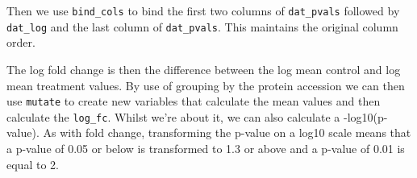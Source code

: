 \documentclass[12pt,]{book}
\newenvironment{Shaded}{\begin{snugshade}}{\end{snugshade}}
\newcommand{\KeywordTok}[1]{\textcolor[rgb]{0.13,0.29,0.53}{\textbf{#1}}}
\newcommand{\DataTypeTok}[1]{\textcolor[rgb]{0.13,0.29,0.53}{#1}}
\newcommand{\DecValTok}[1]{\textcolor[rgb]{0.00,0.00,0.81}{#1}}
\newcommand{\StringTok}[1]{\textcolor[rgb]{0.31,0.60,0.02}{#1}}
\newcommand{\CommentTok}[1]{\textcolor[rgb]{0.56,0.35,0.01}{\textit{#1}}}
\newcommand{\OperatorTok}[1]{\textcolor[rgb]{0.81,0.36,0.00}{\textbf{#1}}}
\newcommand{\NormalTok}[1]{#1}
\theoremstyle{definition}
\theoremstyle{definition}
\theoremstyle{definition}
\theoremstyle{remark}
\begin{document}
Then we use \texttt{bind\_cols} to bind the first two columns of
\texttt{dat\_pvals} followed by \texttt{dat\_log} and the last column of
\texttt{dat\_pvals}. This maintains the original column order.

\begin{Shaded}
\end{Shaded}

The log fold change is then the difference between the log mean control
and log mean treatment values. By use of grouping by the protein
accession we can then use \texttt{mutate} to create new variables that
calculate the mean values and then calculate the \texttt{log\_fc}.
Whilst we're about it, we can also calculate a -log10(p-value). As with
fold change, transforming the p-value on a log10 scale means that a
p-value of 0.05 or below is transformed to 1.3 or above and a p-value of
0.01 is equal to 2.

\begin{Shaded}
\end{Shaded}
\end{document}
